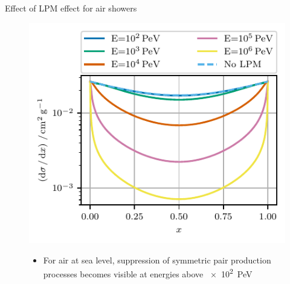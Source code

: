 \documentclass[t]{beamer}
\begin{document}
\begin{columns}[onlytextwidth]
\begin{column}{0.45\textwidth}
\begin{block}[equal height group=PLOTS]{Effect of LPM effect for air showers}
              \begin{figure}
              \begin{minipage}[t]{0.49\textwidth}
                \includegraphics[width=\linewidth, keepaspectratio]{../plots/lpm_photopair_differential_small.pdf}
                \vspace{-1.5cm}
                \begin{itemize}
                  \item For air at sea level, suppression of symmetric pair production processes becomes visible at energies above \SI{e2}{\peta\electronvolt}


\end{itemize}
\end{minipage}
\end{figure}
\end{block}
\end{column}
\end{columns}
\end{document}
